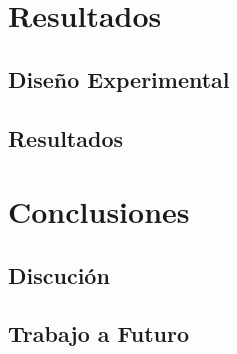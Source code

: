\chapter{Resultados}

\section{Diseño Experimental}

\section{Resultados}

\chapter{Conclusiones}

\section{Discución}

\section{Trabajo a Futuro}